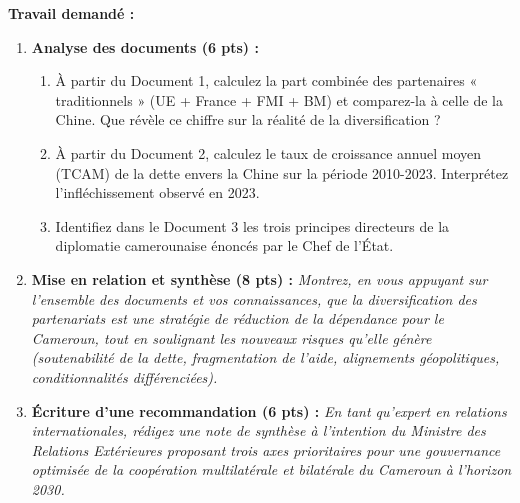 \documentclass[11pt]{article}
\newcommand{\cle}[1]{{\popxbold\color{popdark}#1}}
\begin{document}
\begin{exercice}
\begin{quote}
\end{quote}
\vspace{0.5cm}
\noindent\textbf{Travail demandé :}
\begin{enumerate}
    \item \textbf{Analyse des documents (6 pts) :}
    \begin{enumerate}
        \item À partir du Document 1, calculez la part combinée des partenaires « traditionnels » (UE + France + FMI + BM) et comparez-la à celle de la Chine. Que révèle ce chiffre sur la réalité de la \cle{diversification} ?
        \item À partir du Document 2, calculez le taux de croissance annuel moyen (TCAM) de la dette envers la Chine sur la période 2010-2023. Interprétez l'infléchissement observé en 2023.
        \item Identifiez dans le Document 3 les trois principes directeurs de la diplomatie camerounaise énoncés par le Chef de l'État.
    \end{enumerate}
    \item \textbf{Mise en relation et synthèse (8 pts) :}
    \emph{Montrez, en vous appuyant sur l'ensemble des documents et vos connaissances, que la diversification des partenariats est une stratégie de réduction de la dépendance pour le Cameroun, tout en soulignant les nouveaux risques qu'elle génère (soutenabilité de la dette, fragmentation de l'aide, alignements géopolitiques, conditionnalités différenciées).}
    \item \textbf{Écriture d'une recommandation (6 pts) :}
    \emph{En tant qu'expert en relations internationales, rédigez une note de synthèse à l'intention du Ministre des Relations Extérieures proposant trois axes prioritaires pour une \cle{gouvernance} optimisée de la coopération multilatérale et bilatérale du Cameroun à l'horizon 2030.}
\end{enumerate}
\end{exercice}
\end{document}
